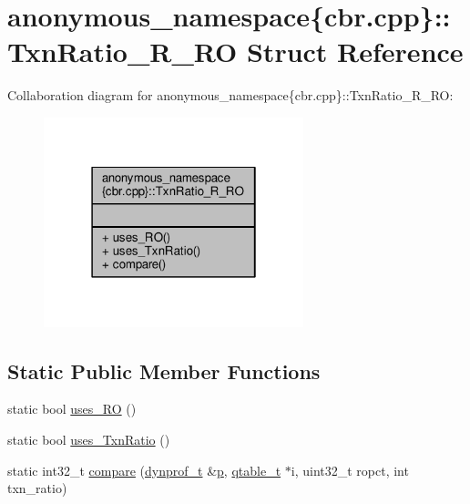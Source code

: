 \hypertarget{structanonymous__namespace_02cbr_8cpp_03_1_1TxnRatio__R__RO}{\section{anonymous\-\_\-namespace\{cbr.\-cpp\}\-:\-:Txn\-Ratio\-\_\-\-R\-\_\-\-R\-O Struct Reference}
\label{structanonymous__namespace_02cbr_8cpp_03_1_1TxnRatio__R__RO}
}


Collaboration diagram for anonymous\-\_\-namespace\{cbr.\-cpp\}\-:\-:Txn\-Ratio\-\_\-\-R\-\_\-\-R\-O\-:
\nopagebreak
\begin{figure}[H]
\begin{center}
\leavevmode
\includegraphics[width=214pt]{structanonymous__namespace_02cbr_8cpp_03_1_1TxnRatio__R__RO__coll__graph}
\end{center}
\end{figure}
\subsection*{Static Public Member Functions}
\begin{DoxyCompactItemize}
\item 
static bool \hyperlink{structanonymous__namespace_02cbr_8cpp_03_1_1TxnRatio__R__RO_ac02132f56afbe8514642022c2327149e}{uses\-\_\-\-R\-O} ()
\item 
static bool \hyperlink{structanonymous__namespace_02cbr_8cpp_03_1_1TxnRatio__R__RO_ab8a0df1266e6a43cdf93714ef3f4ad7d}{uses\-\_\-\-Txn\-Ratio} ()
\item 
static int32\-\_\-t \hyperlink{structanonymous__namespace_02cbr_8cpp_03_1_1TxnRatio__R__RO_a3eb943698a5eec535e53e61bd56a9625}{compare} (\hyperlink{structstm_1_1dynprof__t}{dynprof\-\_\-t} \&\hyperlink{counted__ptr_8hpp_a5c9f59d7c24e3fd6ceae319a968fc3e0}{p}, \hyperlink{structstm_1_1qtable__t}{qtable\-\_\-t} $\ast$i, uint32\-\_\-t ropct, int txn\-\_\-ratio)
\end{DoxyCompactItemize}



